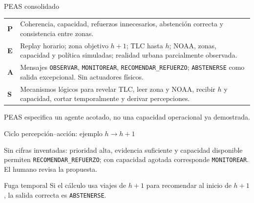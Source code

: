 \documentclass[aspectratio=169,11pt]{beamer}
\newcommand{\accion}[1]{\texttt{#1}}
\begin{document}
\begin{frame}{PEAS consolidado}
  \small
  \begin{tabularx}{\textwidth}{>{\bfseries}p{}X}
    \toprule
    P & Coherencia, capacidad, refuerzos innecesarios, abstención correcta y consistencia entre zonas. \\
    E & Replay horario; zona objetivo $h+1$; TLC hasta $h$; NOAA, zonas, capacidad y política simuladas; realidad urbana parcialmente observada. \\
    A & Mensajes \accion{OBSERVAR}, \accion{MONITOREAR}, \accion{RECOMENDAR\_REFUERZO}; \accion{ABSTENERSE} como salida excepcional. Sin actuadores físicos. \\
    S & Mecanismos lógicos para revelar TLC, leer zona y NOAA, recibir $h$ y capacidad, cortar temporalmente y derivar percepciones. \\
    \bottomrule
  \end{tabularx}
  \vfill
  \alert{PEAS especifica un agente acotado, no una capacidad operacional ya demostrada.}
\end{frame}

\begin{frame}{Ciclo percepción--acción: ejemplo $h\rightarrow h+1$}
  \centering
  \vfill
  \small
  Sin cifras inventadas: prioridad alta, evidencia suficiente y capacidad disponible permiten \accion{RECOMENDAR\_REFUERZO}; con capacidad agotada corresponde \accion{MONITOREAR}. El humano revisa la propuesta.
  \begin{alertblock}{Fuga temporal}
    Si el cálculo usa viajes de $h+1$ para recomendar al inicio de $h+1$, la salida correcta es \accion{ABSTENERSE}.
  \end{alertblock}
\end{frame}
\end{document}

